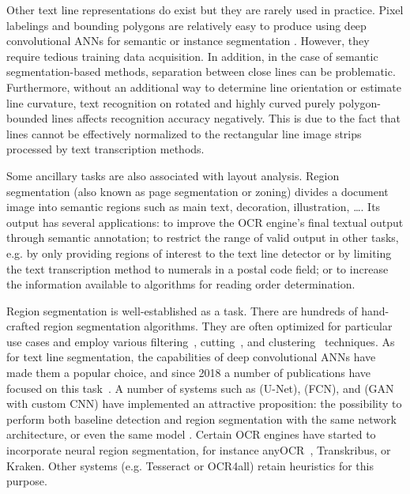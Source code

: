 Other text line representations do exist but they are rarely used in practice.
Pixel labelings and bounding polygons are relatively easy to produce using deep
convolutional ANNs for semantic \cite{pastor2016complete,alberti2019labeling}
or instance segmentation \cite{prusty2019indiscapes}. However, they require
tedious training data acquisition. In addition, in the case of semantic
segmentation-based methods, separation between close lines can be problematic.
Furthermore, without an additional way to determine line orientation or
estimate line curvature, text recognition on rotated and highly curved purely
polygon-bounded lines affects recognition accuracy negatively. This is due to
the fact that lines cannot be effectively normalized to the rectangular line
image strips processed by text transcription methods. 

Some ancillary tasks are also associated with layout analysis. Region
segmentation (also known as page segmentation or zoning) divides a document
image into semantic regions such as main text, decoration, illustration, \dots.
Its output has several applications: to improve the OCR engine’s final textual
output through semantic annotation; to restrict the range of valid output in
other tasks, e.g. by only providing regions of interest to the text line
detector or by limiting the text transcription method to numerals in a postal
code field; or to increase the information available to algorithms for reading
order determination. 

Region segmentation is well-established as a task. There are hundreds of
hand-crafted region segmentation algorithms. They are often optimized for
particular use cases and employ various filtering~\cite{PAVLIDIS1992484},
cutting~\cite{ha1995recursive,kruatrachue2005fast}, and
clustering~\cite{drivas1995page,kise1998segmentation} techniques. As for text
line segmentation, the capabilities of deep convolutional ANNs have made them a
popular choice, and since 2018 a number of publications have focused on this
task~\cite{wick2018fully,oliveira2018dhsegment,xu2018multi,quiros2018multi,he2017multi,chen2017convolutional,monnier2020docextractor}.
A number of systems such as \cite{oliveira2018dhsegment} (U-Net),
\cite{xu2018multi} (FCN), and \cite{quiros2018multi} (GAN with custom CNN) have
implemented an attractive proposition: the possibility to perform both baseline
detection and region segmentation with the same network architecture, or even
the same model \cite{quiros2018multi,xu2018multi}. Certain OCR engines have
started to incorporate neural region segmentation, for instance
anyOCR~\cite{bukhari2017anyocr}, Transkribus, or Kraken. Other systems (e.g.
Tesseract or OCR4all) retain heuristics for this purpose.

